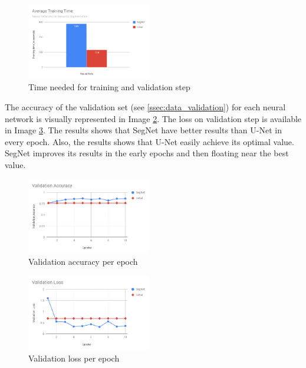 \documentclass[10pt,twocolumn,letterpaper]{article}
\begin{document}
\begin{figure}[ht]
  \centering
  \includegraphics[width=0.48\textwidth]{graph_training_time.png}
  \caption{Time needed for training and validation step}
  \label{fig:training_time}
\end{figure}

The accuracy of the validation set (see \ref{ssec:data_validation}) for each neural network is visually represented in Image \ref{fig:val_acc}. The loss on validation step is available in Image \ref{fig:val_loss}. The results shows that SegNet have better results than U-Net in every epoch. Also, the results shows that U-Net easily achieve its optimal value. SegNet improves its results in the early epochs and then floating near the best value.

\begin{figure}[ht]
  \centering
  \includegraphics[width=0.48\textwidth]{graph_val_acc.png}
  \caption{Validation accuracy per epoch}
  \label{fig:val_acc}
\end{figure}

\begin{figure}[ht]
  \centering
  \includegraphics[width=0.48\textwidth]{graph_val_loss.png}
  \caption{Validation loss per epoch}
  \label{fig:val_loss}
\end{figure}
\end{document}
